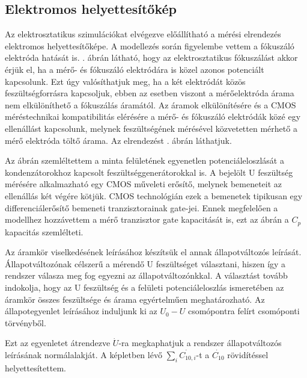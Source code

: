 \subsection{Elektromos helyettesítőkép}
\label{chap:circuit}
Az elektrosztatikus szimulációkat elvégezve előállítható a mérési elrendezés elektromos helyettesítőképe. A modellezés során figyelembe vettem a fókuszáló elektróda hatását is. . ábrán látható, hogy az elektrosztatikus fókuszálást akkor érjük el, ha a mérő- és fókuszáló elektródára is közel azonos potenciált kapcsolunk. Ezt úgy valósíthatjuk meg, ha a két elektródát közös feszültségforrásra kapcsoljuk, ebben az esetben viszont a mérőelektróda árama nem elkülöníthető a fókuszálás áramától. Az áramok elkülönítésére és a CMOS méréstechnikai kompatibilitás elérésére a mérő- és fókuszáló elektródák közé egy ellenállást kapcsolunk, melynek feszültségének mérésével közvetetten mérhető a mérő elektróda töltő árama. Az elrendezést . ábrán láthatjuk.


Az ábrán szemléltettem a minta felületének egyenetlen potenciáleloszlását a kondenzátorokhoz kapcsolt feszültséggenerátorokkal is. A bejelölt U feszültség mérésére alkalmazható egy CMOS műveleti erősítő, melynek bemeneteit az ellenállás két végére kötjük. CMOS technológián ezek a bemenetek tipikusan egy differenciálerősítő bemeneti tranzisztorainak gate-jei. Ennek megfelelően a modellhez hozzávettem a mérő tranzisztor gate kapacitását is, ezt az ábrán a $C_p$ kapacitás szemlélteti.

Az áramkör viselkedésének leírásához készítsük el annak állapotváltozós leírását. Állapotváltozónak célszerű a mérendő U feszültséget választani, hiszen így a rendszer válasza meg fog egyezni az állapotváltozónkkal. A választást tovább indokolja, hogy az U feszültség és a felületi potenciáleloszlás ismeretében az áramkör összes feszültsége és árama egyértelműen meghatározható. Az állapotegyenlet leírásához induljunk ki az $U_0-U$ csomópontra felírt csomóponti törvényből.


Ezt az egyenletet átrendezve $\dot{U}$-ra megkaphatjuk a rendszer állapotváltozós leírásának normálalakját. A képletben lévő $\sum_i \dot{C_{10,i}}$-t a $\dot{C_{10}}$ rövidítéssel helyettesítettem.

